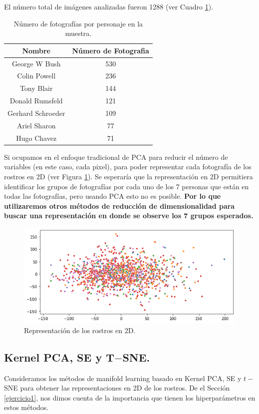 \documentclass[paper=letter, fontsize=11pt]{scrartcl}
\numberwithin{equation}{section} %
\numberwithin{figure}{section} %
\numberwithin{table}{section} %
\begin{document}
El número total de imágenes analizadas fueron 1288 (ver Cuadro \ref{tab:conteo_imagenes}).

\begin{table}[H]
    \centering
    \begin{tabular}{c|c}
         Nombre& Número de Fotografia \\ \hline \hline
         George W Bush  &  530\\
Colin Powell    & 236\\
Tony Blair      & 144\\
Donald Rumsfeld & 121\\
Gerhard Schroeder  & 109\\
Ariel Sharon    &77\\
Hugo Chavez     &71\\ \hline \hline
    \end{tabular}
    \caption{Número de fotografías por personaje en la muestra.}
    \label{tab:conteo_imagenes}
\end{table}

Si ocupamos en el enfoque tradicional de PCA para reducir el número de variables (en este caso, cada pixel), para poder representar cada fotografía de los rostros en 2D (ver Figura \ref{fig:pca_faces}). Se esperaría que la representación en 2D permitiera identificar los grupos de fotografías por cada uno de los 7 personas que están en todas las fotografías, pero usando PCA esto no es posible. \textbf{Por lo que utilizaremos otros métodos de reducción de dimensionalidad para buscar una representación en donde se observe los 7 grupos esperados.}
\begin{figure}[H]
    \centering
    \includegraphics[scale=0.7]{figure/pca_faces.png}
    \caption{Representación de los rostros en 2D.}
    \label{fig:pca_faces}
\end{figure}

\subsection*{Kernel PCA, SE y T$-$SNE.}
Consideramos los métodos de manifold learning basado en Kernel PCA, SE y $t-$SNE para obtener las representaciones en 2D de los rostros. De el Sección \ref{ejercicio1}, nos dimos cuenta de la importancia que tienen los hiperparámetros en estos métodos. \\
\end{document}
